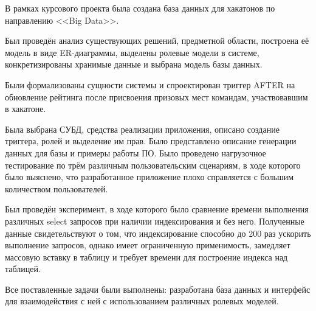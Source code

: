 
В рамках курсового проекта была создана база данных для хакатонов по направлению <<Big Data>>.

Был проведён анализ существующих решений, предметной области, построена её модель в виде ER-диаграммы, выделены ролевые модели в системе, конкретизированы хранимые данные и выбрана модель базы данных.

Были формализованы сущности системы и спроектирован триггер AFTER на обновление рейтинга после присвоения призовых мест командам, участвовавшим в хакатоне. 

Была выбрана СУБД, средства реализации приложения, описано создание триггера, ролей и выделение им прав. Было представлено описание генерации данных для базы и примеры работы ПО. Было проведено нагрузочное тестирование по трём различным пользовательским сценариям, в ходе которого было выяснено, что разработанное приложение плохо справляется с большим количеством пользователей.

Был проведён эксперимент, в ходе которого было сравнение времени выполнения различных select запросов при наличии индексирования и без него. Полученные данные свидетельствуют о том, что индексирование способно до 200 раз ускорить выполнение запросов, однако имеет ограниченную применимость, замедляет массовую вставку в таблицу и требует времени для построение индекса над таблицей.  

Все поставленные задачи были выполнены: разработана база данных и интерфейс для взаимодействия с ней с использованием различных ролевых моделей. 